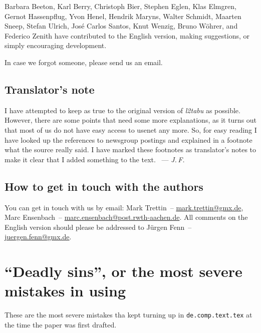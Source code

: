 \documentclass[abstract=on, singlepage=on, paper=a4]{scrartcl}
\newcommand{\Author}[1]{\emph{#1}}
\newcommand{\Doku}[1]{\emph{#1}}
\begin{document}
Barbara Beeton, Karl Berry, Christoph Bier, Stephen Eglen, Klas
Elmgren, Gernot Hassenpflug, Yvon Henel, Hendrik Maryns, Walter
Schmidt, Maarten Sneep, Stefan Ulrich, José Carlos Santos, Knut
Wenzig, Bruno Wöhrer, and Federico Zenith have contributed to the
English version, making suggestions, or simply encouraging
development.

\medskip\noindent
In case we forgot someone, please send us an email.

\subsection*{Translator's note}
\label{sec:translators-note}

I have attempted to keep as true to the original version of
\Doku{l2tabu} as possible. However, there are some points that need
some more explanations, as it turns out that most of us do not have
easy access to usenet any more. So, for easy reading I have looked up
the references to newsgroup postings and explained in a footnote what
the source really said. I have marked these footnotes as translator's
notes to make it clear that I added something to the text.
~--- \Author{J.\,F.}

\subsection*{How to get in touch with the authors}
\label{sec:how-get-touch}

You can get in touch with us by email: Mark Trettin~--
\url{mark.trettin@gmx.de}, Marc Ensenbach~--
\url{marc.ensenbach@post.rwth-aachen.de}. All comments on the English
version should please be addressed to Jürgen Fenn~--
\url{juergen.fenn@gmx.de}.

\newpage
\tableofcontents

\section{\enquote{Deadly sins}, or the most severe mistakes in using \LaTeXe}
\label{sec:deadly-sins}

These are the most severe mistakes tha kept turning up in
\texttt{de.comp.text.tex} at the time the paper was first drafted.
\end{document}
